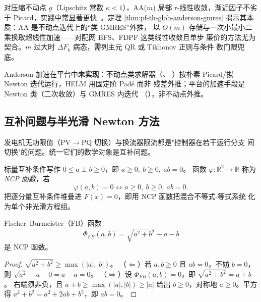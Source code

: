 \begin{remark}[非线性收敛与工程意义]\label{rem:pf-th-glob-anderson}
对压缩不动点 $g$（Lipschitz 常数 $\kappa<1$），AA($m$) 局部 r-线性收敛，渐近因子不劣于
Picard，实践中常显著更快~\cite{pfglob-tothkelley}。定理
\ref{thm:pf-th-glob-anderson-gmres} 揭示其本质：AA 是不动点迭代上的“类 GMRES”外推，
以 $O(m)$ 存储与一次小最小二乘换取超线性加速——对配网 BFS、FDPF 这类线性收敛且单步
廉价的方法尤为契合。$m$ 过大时 $\Delta F_k$ 病态，需列主元 QR 或 Tikhonov 正则与条件
数门限兜底。
\end{remark}

\begin{gapnote}
Anderson 加速在平台中\textbf{未实现}：不动点类求解器（、
）按朴素 Picard/拟 Newton 迭代运行，HELM 用固定阶 Padé 而非
残差外推；平台的加速手段是 Newton 类（二次收敛）与 GMRES 内迭代
（），非不动点外推。
\end{gapnote}

\subsection{互补问题与半光滑 Newton 方法}\label{sec:pf-th-glob-ncp}

发电机无功限值（PV$\to$PQ 切换）与换流器限流都是"控制器在若干运行分支
间切换"的问题。统一它们的数学对象是互补问题。

\begin{definition}\label{sec:pf-th-glob-def-ncp}
标量互补条件写作 $0\le a\perp b\ge0$，即 $a\ge0,\ b\ge0,\ ab=0$。
函数 $\varphi:\mathbb R^2\to\mathbb R$ 称为 \emph{NCP 函数}，若
\begin{equation}
\varphi(a,b)=0\iff a\ge0,\ b\ge0,\ ab=0 .
\end{equation}
把逐分量互补条件堆叠进 $F(x)=0$，即用 NCP 函数把混合不等式-等式系统
化为单个非光滑方程组。
\end{definition}

\begin{proposition}\label{sec:pf-th-glob-prop-fb}
Fischer--Burmeister（FB）函数~\cite{pfglob-fischer}
\begin{equation}
\Phi_{FB}(a,b)=\sqrt{a^2+b^2}-a-b
\end{equation}
是 NCP 函数。
\end{proposition}

\begin{proof}
$\sqrt{a^2+b^2}\ge\max(|a|,|b|)$。
（$\Leftarrow$）若 $a,b\ge0$ 且 $ab=0$，不妨 $b=0$，则
$\sqrt{a^2}-a-0=a-a=0$。
（$\Rightarrow$）设 $\Phi_{FB}(a,b)=0$，即 $\sqrt{a^2+b^2}=a+b$。
右端须非负，且 $a+b\ge\max(|a|,|b|)\ge|a|$ 给出 $b\ge0$，对称地
$a\ge0$。平方得 $a^2+b^2=a^2+2ab+b^2$，即 $ab=0$。
\end{proof}

